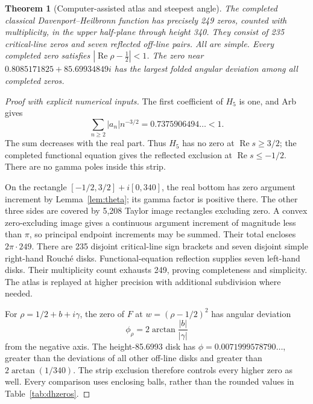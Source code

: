 \documentclass[11pt]{article}
\newtheorem{theorem}{Theorem}[section]
\theoremstyle{remark}
\DeclareMathOperator{\Rea}{Re}
\begin{document}
\begin{theorem}[Computer-assisted atlas and steepest angle]\label{thm:atlas}
The completed classical Davenport--Heilbronn function has precisely 249
zeros, counted with multiplicity, in the upper half-plane through height
340. They consist of 235 critical-line zeros and seven reflected off-line
pairs. All are simple. Every completed zero satisfies
\(|\Rea\rho-\tfrac12|<1\). The zero near
\(0.8085171825+85.69934849i\) has the largest folded angular deviation among
all completed zeros.
\end{theorem}
\begin{proof}[Proof with explicit numerical inputs]
The first coefficient of \(H_5\) is one, and Arb gives
\begin{equation}\label{eq:tailstrip}
 \sum_{n\ge2}|a_n|n^{-3/2}=0.7375906494\ldots<1.
\end{equation}
The sum decreases with the real part. Thus \(H_5\) has no zero at
\(\Rea s\ge3/2\); the completed functional equation gives the reflected
exclusion at \(\Rea s\le-1/2\).
There are no gamma poles inside this strip.

On the rectangle \([-1/2,3/2]+i[0,340]\), the real bottom has zero argument
increment by Lemma~\ref{lem:theta}; its gamma factor is positive there.
The other three sides are covered by 5,208 Taylor image rectangles excluding
zero. A convex zero-excluding image gives a continuous argument increment
of magnitude less than \(\pi\), so principal endpoint increments may be
summed. Their total encloses \(2\pi\cdot249\).
There are 235 disjoint critical-line sign brackets and seven disjoint simple
right-hand Rouché disks. Functional-equation reflection supplies seven
left-hand disks. Their multiplicity count exhausts 249, proving completeness
and simplicity. The atlas is replayed at higher precision with additional
subdivision where needed.

For \(\rho=1/2+b+i\gamma\), the zero of \(F\) at
\(w=(\rho-1/2)^2\) has angular deviation
\begin{equation}\label{eq:angle}
 \phi_\rho=2\arctan\frac{|b|}{|\gamma|}
\end{equation}
from the negative axis. The height-85.6993 disk has
\(\phi=0.0071999578790\ldots\), greater than the deviations of all other
off-line disks and greater than \(2\arctan(1/340)\).
The strip exclusion therefore controls every higher zero as well.
Every comparison uses enclosing balls, rather than the rounded values in
Table~\ref{tab:dhzeros}.
\end{proof}
\end{document}
